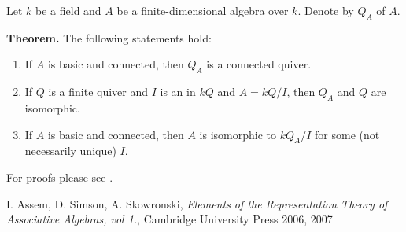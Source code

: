 \documentclass[12pt]{article}
\begin{document}
Let $k$ be a field and $A$ be a finite-dimensional algebra over $k$. Denote by $Q_A$  of $A$.

\textbf{Theorem.} The following statements hold:
\begin{enumerate}
\item If $A$ is basic and connected, then $Q_A$ is a connected quiver.
\item If $Q$ is a finite quiver and $I$ is an  in $kQ$ and $A=kQ/I$, then $Q_A$ and $Q$ are isomorphic.
\item If $A$ is basic and connected, then $A$ is isomorphic to $kQ_A/I$ for some (not necessarily unique)  $I$.
\end{enumerate}

For proofs please see \cite[Chapter II.3]{ASS}.

\begin{thebibliography}{99}
 I. Assem, D. Simson, A. Skowronski, \textit{Elements of the Representation Theory of Associative Algebras, vol 1.}, Cambridge University Press 2006, 2007
\end{thebibliography}

\end{document}
